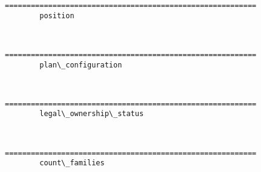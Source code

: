 \documentclass[11pt]{article}
\begin{document}
    \begin{Verbatim}[commandchars=\\\{\}]
==========================================================
	 	position

    \end{Verbatim}

    \begin{center}
    \end{center}
    { \hspace*{\fill} \\}
    
    \begin{Verbatim}[commandchars=\\\{\}]
==========================================================
	 	plan\_configuration

    \end{Verbatim}

    \begin{center}
    \end{center}
    { \hspace*{\fill} \\}
    
    \begin{Verbatim}[commandchars=\\\{\}]
==========================================================
	 	legal\_ownership\_status

    \end{Verbatim}

    \begin{center}
    \end{center}
    { \hspace*{\fill} \\}
    
    \begin{Verbatim}[commandchars=\\\{\}]
==========================================================
	 	count\_families

    \end{Verbatim}

    \begin{center}
    \end{center}
    { \hspace*{\fill} \\}
    
\end{document}
